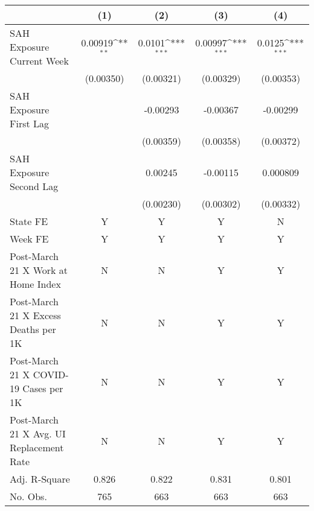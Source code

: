 {
\def\sym#1{\ifmmode^{#1}\else\(^{#1}\)\fi}
\begin{tabular}{l*{4}{c}}
\hline\hline
            &\multicolumn{1}{c}{(1)}         &\multicolumn{1}{c}{(2)}         &\multicolumn{1}{c}{(3)}         &\multicolumn{1}{c}{(4)}         \\
\hline
SAH Exposure Current Week&     0.00919\sym{**} &      0.0101\sym{***}&     0.00997\sym{***}&      0.0125\sym{***}\\
            &   (0.00350)         &   (0.00321)         &   (0.00329)         &   (0.00353)         \\
SAH Exposure First Lag&                     &    -0.00293         &    -0.00367         &    -0.00299         \\
            &                     &   (0.00359)         &   (0.00358)         &   (0.00372)         \\
SAH Exposure Second Lag&                     &     0.00245         &    -0.00115         &    0.000809         \\
            &                     &   (0.00230)         &   (0.00302)         &   (0.00332)         \\
\hline
State FE    &           Y         &           Y         &           Y         &           N         \\
Week FE     &           Y         &           Y         &           Y         &           Y         \\
Post-March 21 X Work at Home Index&           N         &           N         &           Y         &           Y         \\
Post-March 21 X Excess Deaths per 1K&           N         &           N         &           Y         &           Y         \\
Post-March 21 X COVID-19 Cases per 1K&           N         &           N         &           Y         &           Y         \\
Post-March 21 X Avg. UI Replacement Rate&           N         &           N         &           Y         &           Y         \\
Adj. R-Square&       0.826         &       0.822         &       0.831         &       0.801         \\
No. Obs.    &         765         &         663         &         663         &         663         \\
\hline\hline
\end{tabular}
}
